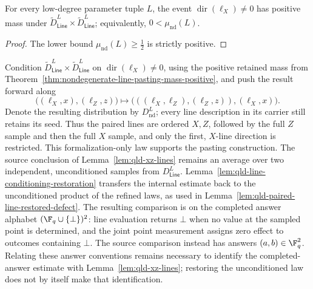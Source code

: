 \begin{theorem}
	\label{thm:nondegenerate-line-pasting-mass-positive}
	\leanok
	For every low-degree parameter tuple $L$, the event
	$\operatorname{dir}(\ell_X)\ne 0$ has positive mass under
	$\widetilde D_{\mathsf{Line}}^L\times\widetilde D_{\mathsf{Line}}^L$; equivalently,
	$0<\mu_{\mathrm{nd}}(L)$.
\end{theorem}
\begin{proof}
	\leanok
	The lower bound $\mu_{\mathrm{nd}}(L)\geq\frac12$ is strictly positive.
\end{proof}

\begin{definition}
	\label{def:nondegenerate-line-pasting-dist}
	\leanok
	Condition $\widetilde D_{\mathsf{Line}}^L\times\widetilde D_{\mathsf{Line}}^L$ on
	$\operatorname{dir}(\ell_X)\ne 0$, using the positive retained mass from
	Theorem~\ref{thm:nondegenerate-line-pasting-mass-positive}, and push the
	result forward along
	\[
		\big((\ell_X,x),(\ell_Z,z)\big)
		\longmapsto
		\big(((\ell_X,\ell_Z),(\ell_Z,z)),(\ell_X,x)\big).
	\]
	Denote the resulting distribution by $D_{\mathrm{nd}}^L$; every line
	description in its carrier still retains its seed. Thus the paired lines
	are ordered $X,Z$, followed by the full $Z$ sample and then the full
	$X$ sample, and only the first, $X$-line direction is restricted. This
	formalization-only law supports the pasting construction. The source
	conclusion of Lemma~\ref{lem:qld-xz-lines} remains an average over two
	independent, unconditioned samples from $D_{\mathsf{Line}}^L$.
	Lemma~\ref{lem:qld-line-conditioning-restoration} transfers the internal
	estimate back to the unconditioned product of the refined laws, as used in
	Lemma~\ref{lem:qld-paired-line-restored-defect}. The resulting comparison is
	on the completed answer alphabet $(\F_q\cup\{\bot\})^2$: line evaluation
	returns $\bot$ when no value at the sampled point is determined, and the
	joint point measurement assigns zero effect to outcomes containing $\bot$.
	The source comparison instead has answers $(a,b)\in\F_q^2$.
	Relating these answer conventions remains necessary to identify the
	completed-answer estimate with Lemma~\ref{lem:qld-xz-lines}; restoring the
	unconditioned law does not by itself make that identification.
\end{definition}

